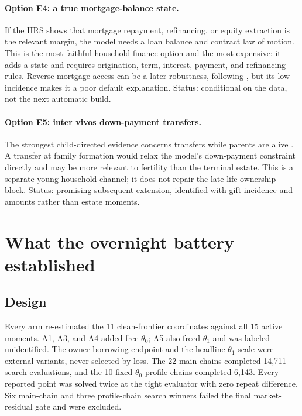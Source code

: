 \documentclass[10pt]{article}
\begin{document}
\paragraph{Option E4: a true mortgage-balance state.}
If the HRS shows that mortgage repayment, refinancing, or equity extraction is
the relevant margin, the model needs a loan balance and contract law of motion.
This is the most faithful household-finance option and the most expensive: it
adds a state and requires origination, term, interest, payment, and refinancing
rules. Reverse-mortgage access can be a later robustness, following
\citet{nakajima2017}, but its low incidence makes it a poor default explanation.
Status: conditional on the data, not the next automatic build.

\paragraph{Option E5: inter vivos down-payment transfers.}
The strongest child-directed evidence concerns transfers while parents are
alive \citep{kvaerner2023,mcgarry1999}. A transfer at family formation would
relax the model's down-payment constraint directly and may be more relevant to
fertility than the terminal estate. This is a separate young-household channel;
it does not repair the late-life ownership block. Status: promising subsequent
extension, identified with gift incidence and amounts rather than estate
moments.

\section{What the overnight battery established}

\subsection{Design}

Every arm re-estimated the 11 clean-frontier coordinates against all 15 active
moments. A1, A3, and A4 added free $\theta_0$; A5 also freed $\theta_1$ and was
labeled unidentified. The owner borrowing endpoint and the headline
$\theta_1$ scale were external variants, never selected by loss. The 22 main
chains completed 14,711 search evaluations, and the 10 fixed-$\theta_0$
profile chains completed 6,143. Every reported point was solved twice at the
tight evaluator with zero repeat difference. Six main-chain and three
profile-chain search winners failed the final market-residual gate and were
excluded.
\end{document}

